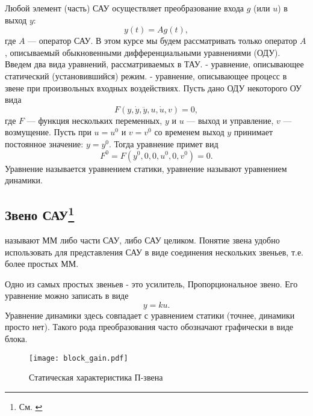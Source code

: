 \documentclass[../../TAU.tex]{subfiles}
\begin{document}
    Любой элемент (часть) САУ осуществляет преобразование входа 
    $g$ (или $u$) в выход $y$:
    \begin{equation}
        y(t) = A g(t),
    \end{equation}
    где $A$ --- оператор САУ. В этом курсе мы будем рассматривать только оператор $A$, описываемый обыкновенными дифференциальными уравнениями (ОДУ). Введем два вида уравнений, рассматриваемых в ТАУ.
     - уравнение, описывающее статический (установившийся) режим.
     - уравнение, описывающее процесс в звене при произвольных входных воздействиях.
    Пусть дано ОДУ некоторого ОУ вида
    \begin{equation}\label{EQ_DYNAMIC}
        F(y,\dot y, \ddot y, u, \dot u, v) = 0,
    \end{equation}
    где $F$ --- функция нескольких переменных, $y$ и $u$ --- выход и управление, $v$ --- возмущение.
    Пусть при $u=u^0$ и $v=v^0$ со временем выход $y$ принимает постоянное значение: $y=y^0$. Тогда уравнение 
    примет вид
    \begin{equation}\label{EQ_STATIC}
        F^0=F(y^0, 0, 0, u^0, 0, v^0) = 0.
    \end{equation}
    Уравнение 
    называется уравнением статики, уравнение 
    называют уравнением динамики.

\subsection[Звено САУ]{Звено САУ\footnote{См. \cite[стр. 21-22]{kim:uch}}}
    
     называют ММ либо части САУ, либо САУ целиком. Понятие звена удобно использовать для представления САУ в виде соединения нескольких звеньев, т.е. более простых ММ.

    Одно из самых простых звеньев - это усилитель, Пропорциональное звено. Его уравнение можно записать в виде
    \begin{equation}
        y = ku.
    \end{equation}
    Уравнение динамики здесь совпадает с уравнением статики (точнее, динамики просто нет). Такого рода преобразования часто обозначают графически в виде блока.
    \begin{figure}[h]
        \centering
        \texttt{[image: block\_gain.pdf]}
        \caption{Статическая характеристика П-звена}
        \centering
    \end{figure}
\end{document}
